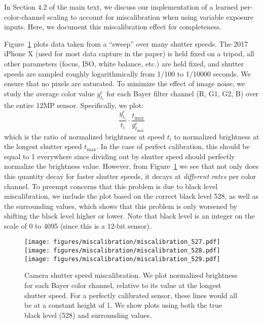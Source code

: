 In Section 4.2 of the main text, we discuss our implementation of a learned per-color-channel scaling to account for miscalibration when using variable exposure inputs. Here, we document this miscalibration effect for completeness. 

Figure~\ref{fig:miscalibration} plots data taken from a ``sweep'' over many shutter speeds. The 2017 iPhone X (used for most data capture in the paper) is held fixed on a tripod, all other parameters (focus, ISO, white balance, etc.) are held fixed, and shutter speeds are sampled roughly logarithmically from 1/100 to 1/10000 seconds. We ensure that no pixels are saturated. To minimize the effect of image noise, we study the average color value $y_{t_i}^c$ for each Bayer filter channel (R, G1, G2, B) over the entire 12MP sensor. Specifically, we plot:
\begin{equation}
    \frac{y_{t_i}^c}{t_i}  \cdot   \frac{t_{\mathrm{max}}}{y_{t_\mathrm{max}}^c} 
\end{equation}
which is the ratio of normalized brightness at speed $t_i$ to normalized brightness at the longest shutter speed $t_{\mathrm{max}}$. In the case of perfect calibration, this should be equal to 1 everywhere since dividing out by shutter speed should perfectly normalize the brightness value. However, from Figure~\ref{fig:miscalibration} we see that not only does this quantity decay for faster shutter speeds, it decays at \emph{different rates} per color channel. To preempt concerns that this problem is due to black level miscalibration, we include the plot based on the correct black level 528, as well as the surrounding values, which shows that this problem is only worsened by shifting the black level higher or lower. Note that black level is an integer on the scale of 0 to 4095 (since this is a 12-bit sensor).

\begin{figure}
    \centering
    \texttt{[image: figures/miscalibration/miscalibration\_527.pdf]}\hspace{-.2cm}
    \texttt{[image: figures/miscalibration/miscalibration\_528.pdf]}\hspace{-.2cm}
    \texttt{[image: figures/miscalibration/miscalibration\_529.pdf]}
    \caption{Camera shutter speed miscalibration. We plot normalized brightness for each Bayer color channel, relative to its value at the longest shutter speed. For a perfectly calibrated sensor, these lines would all be at a constant height of 1. We show plots using both the true black level (528) and surrounding values.}
    \label{fig:miscalibration}
\end{figure}


